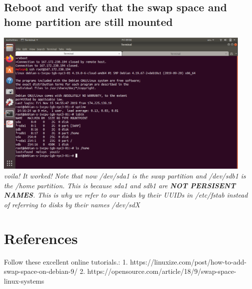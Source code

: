 \documentclass[10pt]{article}
\begin{document}
\subsection{Reboot and verify that the swap space and home partition are still
mounted}
\begin{center}
    \includegraphics[width=0.95\textwidth]{Images/11_done.png}
	\newline\textit{voila! It worked! Note that now /dev/sda1 is the swap
partition and /dev/sdb1 is the /home partition. This is because sda1 and sdb1
are \textbf{NOT PERSISENT NAMES}. This is why we refer to our disks by their
UUIDs in /etc/fstab instead of referring to disks by their names /dev/sdX}
\end{center}


\section{References} Follow these excellent online tutorials.: 1.
https://linuxize.com/post/how-to-add-swap-space-on-debian-9/ 2.
https://opensource.com/article/18/9/swap-space-linux-systems
\end{document}
